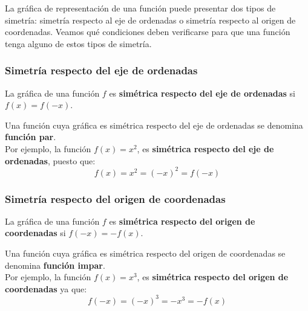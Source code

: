 
La gráfica de representación de una función puede presentar dos tipos de simetría: simetría respecto al eje de ordenadas o simetría respecto al origen de coordenadas. Veamos qué condiciones deben verificarse para que una función tenga alguno de estos tipos de simetría.
\subsubsection{Simetría respecto del eje de ordenadas}
\begin{definition}
	La gráfica de una función $f$ es \textbf{simétrica respecto del eje de ordenadas} si $f(x) = f(-x)$.
\end{definition}
Una función cuya gráfica es simétrica respecto del eje de ordenadas se denomina \textbf{función par}.\\
Por ejemplo, la función $f(x)=x^{2}$, es \textbf{simétrica respecto del eje de ordenadas}, puesto que:
$$f(x) = x^2 = (-x)^2 = f(-x)$$
\subsubsection{Simetría respecto del origen de coordenadas}
\begin{definition}
	La gráfica de una función $f$ es \textbf{simétrica respecto del origen de coordenadas} si $f(-x) = -f(x)$.
\end{definition}
Una función cuya gráfica es simétrica respecto del origen de coordenadas se denomina \textbf{función impar}.\\
Por ejemplo, la función $f(x)=x^{3}$, es \textbf{simétrica respecto del origen de coordenadas} ya que:
$$f(-x)=(-x)^3=-x^3=-f(x)$$

